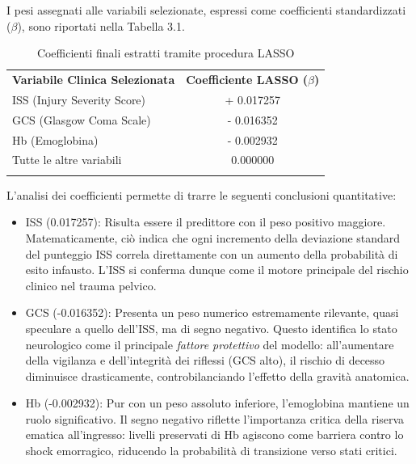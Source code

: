 \documentclass[11pt, oneside, noexaminfo]{sapthesis}   	%
\begin{document}
I pesi assegnati alle variabili selezionate, espressi come coefficienti standardizzati ($\beta$), sono riportati nella Tabella 3.1.

\begin{table}[h]
\centering
\caption{Coefficienti finali estratti tramite procedura LASSO}
\label{tab:coefficienti_lasso}
\begin{tabular}{lc}
\hline
\noalign{\smallskip}
\textbf{Variabile Clinica Selezionata} & \textbf{Coefficiente LASSO ($\beta$)} \\ 
\noalign{\smallskip}
\hline
\noalign{\smallskip}
ISS (Injury Severity Score) & + 0.017257 \\
GCS (Glasgow Coma Scale)    & - 0.016352 \\
Hb (Emoglobina)             & - 0.002932 \\
\noalign{\smallskip}
\hline
\noalign{\smallskip}
Tutte le altre variabili    & 0.000000 \\
\noalign{\smallskip}
\hline
\end{tabular}
\end{table}

L'analisi dei coefficienti permette di trarre le seguenti conclusioni quantitative:

\begin{itemize}
\item {ISS (0.017257)}: Risulta essere il predittore con il peso positivo maggiore. Matematicamente, ciò indica che ogni incremento della deviazione standard del punteggio ISS correla direttamente con un aumento della probabilità di esito infausto. L'ISS si conferma dunque come il motore principale del rischio clinico nel trauma pelvico.

\item {GCS (-0.016352)}: Presenta un peso numerico estremamente rilevante, quasi speculare a quello dell'ISS, ma di segno negativo. Questo identifica lo stato neurologico come il principale \textit{fattore protettivo} del modello: all'aumentare della vigilanza e dell'integrità dei riflessi (GCS alto), il rischio di decesso diminuisce drasticamente, controbilanciando l'effetto della gravità anatomica.

\item {Hb (-0.002932)}: Pur con un peso assoluto inferiore, l'emoglobina mantiene un ruolo significativo. Il segno negativo riflette l'importanza critica della riserva ematica all'ingresso: livelli preservati di Hb agiscono come barriera contro lo shock emorragico, riducendo la probabilità di transizione verso stati critici.
\end{itemize}
\end{document}
